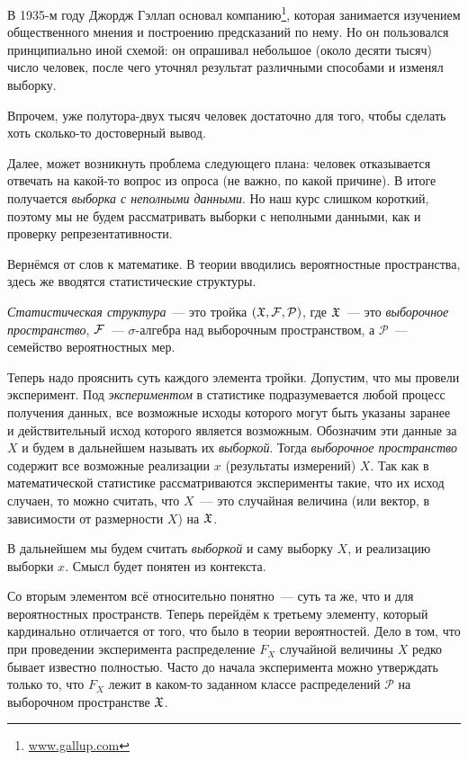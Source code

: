 В 1935-м году Джордж Гэллап основал компанию\footnote{\url{www.gallup.com}}, 
которая занимается изучением общественного мнения и построению предсказаний по 
нему. Но он пользовался принципиально иной схемой: он опрашивал небольшое 
(около десяти тысяч) число человек, после чего уточнял результат различными 
способами и изменял выборку. 

Впрочем, уже полутора-двух тысяч человек достаточно для того, чтобы сделать 
хоть сколько-то достоверный вывод.

Далее, может возникнуть проблема следующего плана: человек отказывается 
отвечать на какой-то вопрос из опроса (не важно, по какой причине). В итоге 
получается \emph{выборка с неполными данными}. Но наш курс слишком короткий, 
поэтому мы не будем рассматривать выборки с неполными данными, как и проверку 
репрезентативности.

Вернёмся от слов к математике. В теории вводились вероятностные пространства, 
здесь же вводятся статистические структуры.
\begin{definition}
	\emph{Статистическая структура}~--- это тройка \((\mathfrak{X}, \mathcal{F}, \mathcal{P})\), 
	где \(\mathfrak{X}\)~--- это \emph{выборочное пространство}, \(\mathcal{F}\)~--- 
	\(\sigma\)-алгебра над выборочным пространством, а \(\mathcal{P}\)~--- 
	семейство 
	вероятностных мер.
\end{definition}

Теперь надо прояснить суть каждого элемента тройки. Допустим, что мы провели 
эксперимент. Под \emph{экспериментом} в статистике подразумевается любой 
процесс получения данных, все возможные исходы которого могут быть указаны 
заранее и действительный исход которого является возможным. Обозначим эти 
данные за \(X\) и будем в дальнейшем называть их \emph{выборкой}. Тогда 
\emph{выборочное пространство} содержит все возможные реализации \(x\) 
(результаты измерений) \(X\). Так как в математической статистике 
рассматриваются эксперименты такие, что их исход случаен, то можно считать, что 
\(X\)~--- это случайная величина (или вектор, в зависимости от размерности 
\(X\)) на \(\mathfrak{X}\).

\begin{remark}
	В дальнейшем мы будем считать \emph{выборкой} и саму выборку \(X\), и 
	реализацию выборки \(x\). Смысл будет понятен из контекста.
\end{remark}

Со вторым элементом всё относительно понятно~--- суть та же, что и для 
вероятностных пространств. Теперь перейдём к третьему элементу, который 
кардинально отличается от того, что было в теории вероятностей. Дело в том, что 
при проведении эксперимента распределение \(F_{X}\) случайной величины \(X\) 
редко бывает известно полностью. Часто до начала эксперимента можно утверждать 
только то, что \(F_{X}\) лежит в каком-то заданном классе распределений 
\(\mathcal{P}\) на выборочном пространстве \(\mathfrak{X}\).

